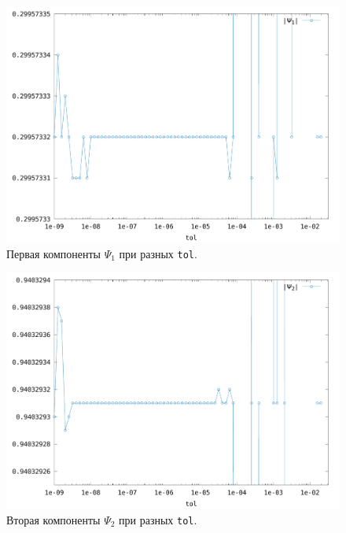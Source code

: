 \documentclass[12pt]{article}
\begin{document}
\begin{figure}[H]
  \hspace{0.5cm}
  \includegraphics[scale=0.5]{psi1_tol_sun}
  \caption{\label{fig:8}Первая компоненты \(\Psi_{1}\) при разных \texttt{tol}.}
\end{figure}

\begin{figure}[H]
  \hspace{0.5cm}
  \includegraphics[scale=0.5]{psi2_tol_sun}
  \caption{\label{fig:9}Вторая компоненты \(\Psi_{2}\) при разных \texttt{tol}.}
\end{figure}
\end{document}

